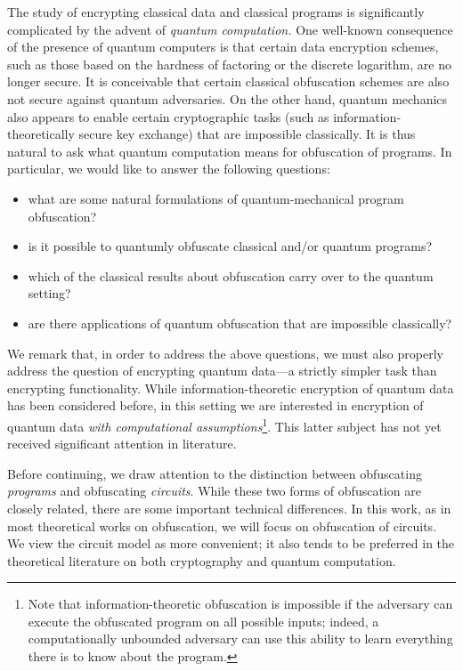 \documentclass[11pt]{article}
\numberwithin{equation}{section}
\begin{document}
{The study of encrypting classical data and classical programs is significantly complicated by the advent of \emph{quantum computation.} One well-known consequence of the presence of quantum computers is that certain data encryption schemes, such as those based on the hardness of factoring or the discrete logarithm, are no longer secure. It is conceivable that certain classical obfuscation schemes are also not secure against quantum adversaries. On the other hand, quantum mechanics also appears to enable certain cryptographic tasks (such as information-theoretically secure key exchange) that are impossible classically. It is thus natural to ask what quantum computation means for obfuscation of programs. In particular, we would like to answer the following questions:

\begin{itemize}
\item what are some natural formulations of quantum-mechanical program obfuscation?
\item is it possible to quantumly obfuscate classical and/or quantum programs?
\item which of the classical results about obfuscation carry over to the quantum setting?
\item are there applications of quantum obfuscation that are impossible classically?
\end{itemize}

We remark that, in order to address the above questions, we must also properly address the question of encrypting quantum data---a strictly simpler task than encrypting functionality. While information-theoretic encryption of quantum data has been considered before, in this setting we are interested in encryption of quantum data \emph{with computational assumptions}\footnote{Note that information-theoretic obfuscation is impossible if the adversary can execute the obfuscated program on all possible inputs; indeed, a computationally unbounded adversary can use this ability to learn everything there is to know about the program.}. This latter subject has not yet received significant attention in literature.

Before continuing, we draw attention to the distinction between obfuscating \emph{programs} and obfuscating \emph{circuits}. While these two forms of obfuscation are closely related, there are some important technical differences. In this work, as in most theoretical works on obfuscation, we will focus on obfuscation of circuits. We view the circuit model as more convenient; it also tends to be preferred in the theoretical literature on both cryptography and quantum computation.

}
\end{document}
